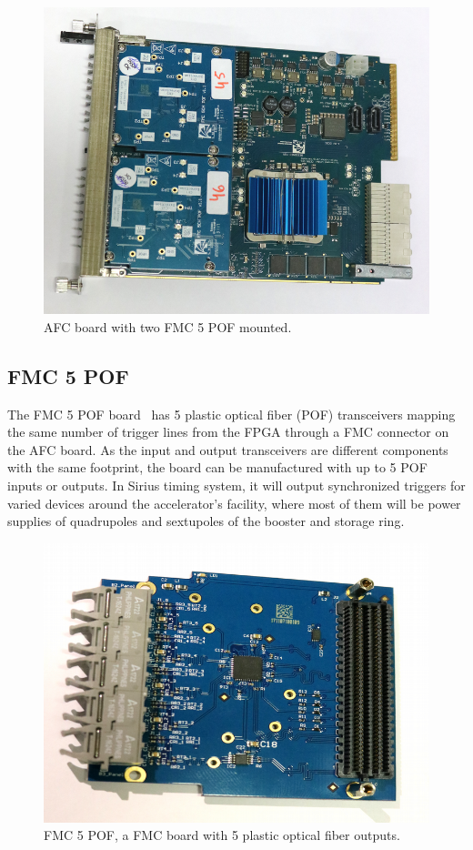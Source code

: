 \documentclass[a4paper,
               biblatex,      %
               ]{jacow}
\begin{document}
\begin{figure}[!htb]
   \centering
   \includegraphics*[width=0.8\columnwidth]{AFC_POFs_resized}
   \caption{AFC board with two FMC 5 POF mounted.}
   \label{fig:afc_pofs}
\end{figure}

\subsection{FMC 5 POF}

The FMC 5 POF board~\cite{fmc-pof-git} has 5 plastic optical fiber (POF) transceivers mapping the same number of trigger lines from the FPGA through a FMC connector on the AFC board. As the input and output transceivers are different components with the same footprint, the board can be manufactured with up to 5 POF inputs or outputs. In Sirius timing system, it will output synchronized triggers for varied devices around the accelerator's facility, where most of them will be power supplies of quadrupoles and sextupoles of the booster and storage ring.

\begin{figure}[!htb]
   \centering
   \includegraphics*[width=0.5\columnwidth]{FMC_POF_resized}
   \caption{FMC 5 POF, a FMC board with 5 plastic optical fiber outputs.}
   \label{fig:fmc_pof}
\end{figure}
\end{document}
